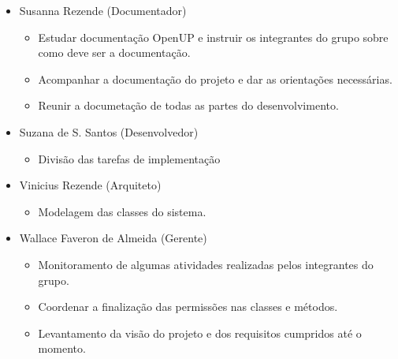 \documentclass[12pt,letterpaper]{article}
\begin{document}
\begin{itemize}
\item {}Susanna Rezende (Documentador)\\
\vspace{-0.5cm}
\begin{itemize}
\item{}Estudar documentação OpenUP e instruir os integrantes do grupo sobre como deve ser a documentação.\\
\item{}Acompanhar a documentação do projeto e dar as orientações necessárias.\\
\item{}Reunir a documetação de todas as partes do desenvolvimento.
\end{itemize}
\vspace{0.5cm}

\item {}Suzana de S. Santos (Desenvolvedor)\\
\vspace{-0.5cm}
\begin{itemize}
\item{}Divisão das tarefas de implementação
\end{itemize}
\vspace{0.5cm}

\item {}Vinicius Rezende (Arquiteto)\\
\vspace{-0.5cm}
\begin{itemize}
\item{}Modelagem das classes do sistema.
\end{itemize}
\vspace{0.5cm}

\item {}Wallace Faveron de Almeida (Gerente)\\
\vspace{-0.5cm}
\begin{itemize}
\item{}Monitoramento de algumas atividades realizadas pelos integrantes do grupo.\\
\item{}Coordenar a finalização das permissões nas classes e métodos.\\
\item{}Levantamento da visão do projeto e dos requisitos cumpridos até o momento.
\end{itemize}

\end{itemize}
\end{document}
